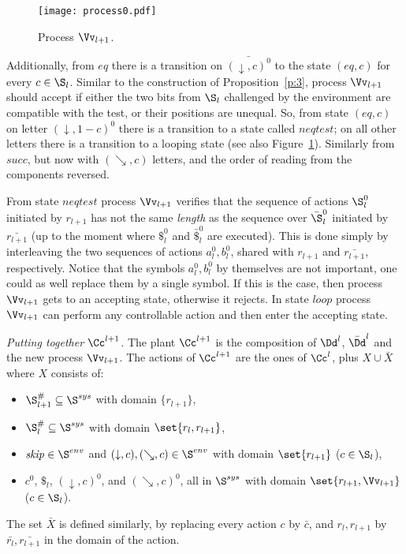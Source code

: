 \documentclass{llncs}
\newcommand{\sskip}{\mathit{skip}}
\newcommand{\inctest}{\searrow}
\newcommand{\eqtest}{\downarrow}
\newcommand{\Ssys}{\S^{sys}}
\newcommand{\Senv}{\S^{env}}
\begin{document}
\begin{figure}
  \centering
  \texttt{[image: process0.pdf]}
  \caption{Process $\Vv_{l+1}$.}
  \label{fig:verifier}
\end{figure}


Additionally, from $\mathit{eq}$ there is a transition on $\bar{(\eqtest,c)^0}$
to the state $(eq,c)$ for every $c\in\S_l$. Similar to the
construction of Proposition~\ref{p:3}, process $\Vv_{l+1}$ should
accept if either the two bits from $\S_l$ challenged by the
environment are compatible with the test, or their positions
are unequal. So, from state $(eq,c)$ on letter
$(\eqtest,1-c)^0$ there is a transition to a state called
$\mathit{neqtest}$; on all other letters there is a transition to a
looping state (see also Figure~\ref{fig:verifier}). Similarly from $\mathit{succ}$, but now with $(\inctest,c)$
letters, and the order of reading from the components reversed.

From state $\mathit{neqtest}$ process $\Vv_{l+1}$ verifies that the sequence of
actions $\S^0_l$ initiated by $r_{l+1}$ has not the same \emph{length} as the
sequence over $\bar \S^0_l$ initiated by $\bar{r_{l+1}}$ (up to the
moment where $\$^0_l$ and $\bar\$^0_l$ are executed). This is done
simply by interleaving the two sequences of actions $a^0_l,b^0_l$, shared with
$r_{l+1}$ and $\bar{r_{l+1}}$, respectively. Notice that
the symbols $a^0_l,b^0_l$ by themselves are not important, one could as well replace
them by a single symbol. If this is the
case, then process $\Vv_{l+1}$ gets to an accepting state, otherwise it
rejects. In state $\mathit{loop}$ process $\Vv_{l+1}$ can perform any 
controllable action and then enter the
accepting state.



\medskip\noindent\textit{Putting together $\Cc^{l+1}$.}
The plant $\Cc^{l+1}$ is the composition of $\Dd^l$, $\bar\Dd^l$ and the
new process $\Vv_{l+1}$. The actions of $\Cc^{l+1}$ are the ones of $\Cc^l$,
plus $X \cup \bar X$ where $X$ consists of:
\begin{itemize}
\item $\S^\#_{l+1}\subseteq \Ssys$ with domain $\{r_{l+1}\}$,
\item $\S^\#_l\subseteq \Ssys$  with domain $\set{r_l,r_{l+1}}$,
\item $\sskip \in \Senv$ and $(\eqtest,c),
  (\inctest,c) \in \Senv$ with domain $\set{r_{l+1}}$ ($c \in
  \S_l$),
\item $c^0$, $\$_l$, $(\eqtest,c)^0$, and $(\inctest,c)^0$, all in $\Ssys$
  with domain $\set{r_{l+1},\Vv_{l+1}}$ ($c\in \S_l$).
\end{itemize}
The set $\bar X$ is defined similarly, by replacing every action $c$
by $\bar c$, and $r_l,r_{l+1}$ by $\bar{r_l},\bar{r_{l+1}}$ in the
domain of the action. 
\end{document}
